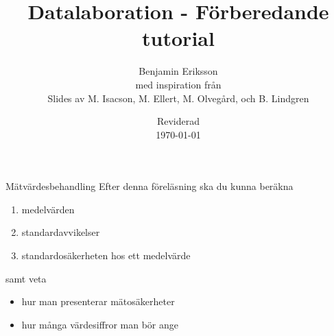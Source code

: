 \documentclass[9pt]{beamer}
\title{Datalaboration - Förberedande tutorial}
\author[benjamin.eriksson@physics.uu.se]{Benjamin Eriksson  \\ \tiny{med inspiration från} \\ \scriptsize{Slides av M. Isacson, M. Ellert, M. Olvegård, och B. Lindgren}}
\institute[Uppsala universitet]{{\small Avdelningen för tillämpad kärnfysik \\ Institutionen för fysik och astronomi} \\ \uulogo}
\date{{\small Reviderad}\\ \today}
\begin{document}
    \begin{frame}{Mätvärdesbehandling}
        Efter denna föreläsning ska du kunna beräkna
        \begin{enumerate}
            \item medelvärden
            \item standardavvikelser
            \item standardosäkerheten hos ett medelvärde
        \end{enumerate}
        \vspace{0.5cm}
        samt veta
        \begin{itemize}
            \item hur man presenterar mätosäkerheter
            \item hur många värdesiffror man bör ange
        \end{itemize}
    \end{frame}
    
\end{document}
